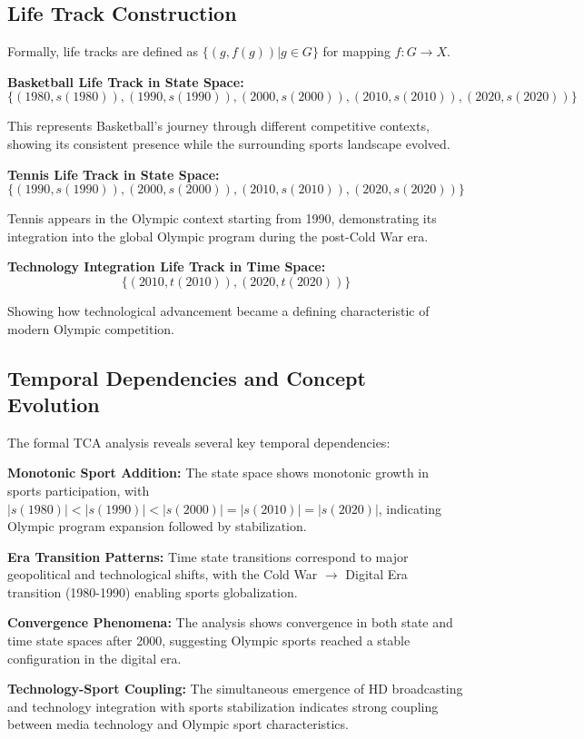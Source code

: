 \documentclass{article}
\begin{document}
\subsection*{Life Track Construction}

Formally, life tracks are defined as $\{(g, f(g)) | g \in G\}$ for mapping $f: G \rightarrow X$.

\textbf{Basketball Life Track in State Space:}
$$\{(1980, s(1980)), (1990, s(1990)), (2000, s(2000)), (2010, s(2010)), (2020, s(2020))\}$$

This represents Basketball's journey through different competitive contexts, showing its consistent presence while the surrounding sports landscape evolved.

\textbf{Tennis Life Track in State Space:}
$$\{(1990, s(1990)), (2000, s(2000)), (2010, s(2010)), (2020, s(2020))\}$$

Tennis appears in the Olympic context starting from 1990, demonstrating its integration into the global Olympic program during the post-Cold War era.

\textbf{Technology Integration Life Track in Time Space:}
$$\{(2010, t(2010)), (2020, t(2020))\}$$

Showing how technological advancement became a defining characteristic of modern Olympic competition.

\subsection*{Temporal Dependencies and Concept Evolution}

The formal TCA analysis reveals several key temporal dependencies:

\textbf{Monotonic Sport Addition:} The state space shows monotonic growth in sports participation, with $|s(1980)| < |s(1990)| < |s(2000)| = |s(2010)| = |s(2020)|$, indicating Olympic program expansion followed by stabilization.

\textbf{Era Transition Patterns:} Time state transitions correspond to major geopolitical and technological shifts, with the Cold War $\rightarrow$ Digital Era transition (1980-1990) enabling sports globalization.

\textbf{Convergence Phenomena:} The analysis shows convergence in both state and time state spaces after 2000, suggesting Olympic sports reached a stable configuration in the digital era.

\textbf{Technology-Sport Coupling:} The simultaneous emergence of HD broadcasting and technology integration with sports stabilization indicates strong coupling between media technology and Olympic sport characteristics.
\end{document}
